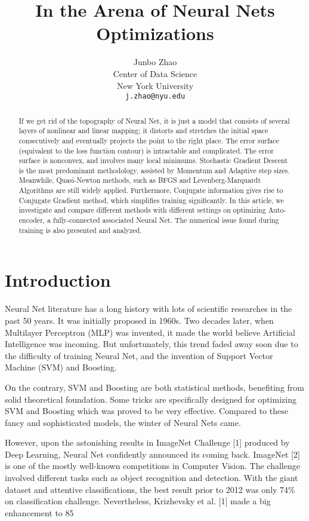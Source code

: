 \documentclass{article} %
\title{In the Arena of Neural Nets Optimizations}
\author{
Junbo Zhao \\
Center of Data Science\\
New York University\\
\texttt{j.zhao@nyu.edu} 
}
\begin{document}
\maketitle

\begin{abstract}
If we get rid of the topography of Neural Net, it is just a model that consists of several layers of nonlinear and linear mapping; it distorts and stretches the initial space consecutively and eventually projects the point to the right place. The error surface (equivalent to the loss function contour) is intractable and complicated. The error surface is nonconvex, and involves many local minimums. Stochastic Gradient Descent is the most predominant methodology, assisted by Momentum and Adaptive step sizes. Meanwhile, Quasi-Newton methods, such as BFGS and Levenberg-Marquardt Algorithms are still widely applied. Furthermore, Conjugate information gives rise to Conjugate Gradient method, which simplifies training significantly. In this article, we investigate and compare different methods with different settings on optimizing Auto-encoder, a fully-connected associated Neural Net. The numerical issue found during training is also presented and analyzed.
\end{abstract}

\section{Introduction}
Neural Net literature has a long history with lots of scientific researches in the past 50 years. It was initially proposed in 1960s. Two decades later, when Multilayer Perceptron (MLP) was invented, it made the world believe Artificial Intelligence was incoming. But unfortunately, this trend faded away soon due to the difficulty of training Neural Net, and the invention of Support Vector Machine (SVM) and Boosting. 

On the contrary, SVM and Boosting are both statistical methods, benefiting from solid theoretical foundation. Some tricks are specifically designed for optimizing SVM and Boosting which was proved to be very effective. Compared to these fancy and sophisticated models, the winter of Neural Nets came.

However, upon the astonishing results in ImageNet Challenge [1] produced by Deep Learning, Neural Net confidently announced its coming back. ImageNet [2] is one of the mostly well-known competitions in Computer Vision. The challenge involved different tasks such as object recognition and detection. With the giant dataset and attentive classifications, the best result prior to 2012 was only 74\% on classification challenge. Nevertheless, Krizhevsky et al. [1] made a big enhancement to 85%
\end{document}
